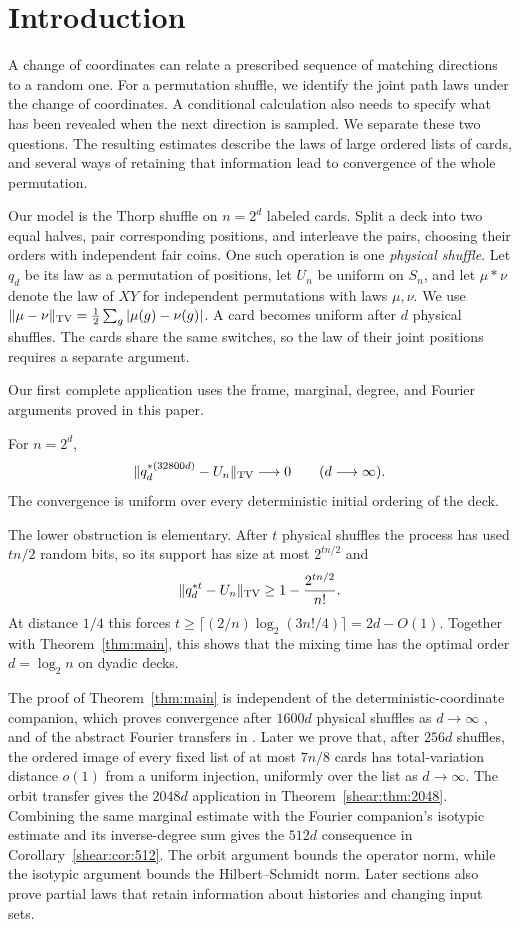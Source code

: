 \section{Introduction}
\label{sec:introduction}

A change of coordinates can relate a prescribed sequence of matching
directions to a random one. For a permutation shuffle, we identify
the joint path laws under the change of coordinates. A conditional
calculation also needs to specify what
has been revealed when the next direction is sampled. We separate these
two questions. The resulting estimates describe the laws of large
ordered lists of cards, and several ways of retaining that information
lead to convergence of the whole permutation.

Our model is the Thorp shuffle on $n=2^d$ labeled cards. Split a deck
into two equal halves, pair corresponding positions, and interleave the
pairs, choosing their orders with independent fair coins. One such
operation is one \emph{physical shuffle}. Let $q_d$ be its law as a
permutation of positions, let $U_n$ be uniform on $S_n$, and let
$\mu*\nu$ denote the law of $XY$ for independent permutations with laws
$\mu,\nu$. We use
$\|\mu-\nu\|_{\mathrm{TV}}=\frac12\sum_g|\mu(g)-\nu(g)|$.
A card becomes uniform after $d$ physical shuffles. The cards share the
same switches, so the law of their joint positions requires a separate
argument.

Our first complete application uses the frame, marginal, degree, and
Fourier arguments proved in this paper.

\begin{theorem}\label{thm:main}
For $n=2^d$,
\[
 \|q_d^{*(32800d)}-U_n\|_{\mathrm{TV}}\longrightarrow0
 \qquad(d\longrightarrow\infty).
\]
The convergence is uniform over every deterministic initial ordering
of the deck.
\end{theorem}

The lower obstruction is elementary. After $t$ physical shuffles the
process has used $tn/2$ random bits, so its support has size at most
$2^{tn/2}$ and
\[
 \|q_d^{*t}-U_n\|_{\mathrm{TV}}\ge1-\frac{2^{tn/2}}{n!}.
\]
At distance $1/4$ this forces
$t\ge\lceil(2/n)\log_2(3n!/4)\rceil=2d-O(1)$.
Together with Theorem~\ref{thm:main}, this shows that the mixing time
has the optimal order $d=\log_2 n$ on dyadic decks.

The proof of Theorem~\ref{thm:main} is independent of the
deterministic-coordinate companion, which proves convergence after
$1600d$ physical shuffles as $d\to\infty$
\cite[Theorem~1.1]{optimal-thorp}, and of the abstract Fourier
transfers in \cite{partial-fourier}. Later we prove that, after $256d$
shuffles, the ordered image of every fixed list of at most $7n/8$ cards
has total-variation distance $o(1)$ from a uniform injection, uniformly
over the list as $d\to\infty$. The orbit transfer gives the $2048d$ application in
Theorem~\ref{shear:thm:2048}. Combining the same marginal estimate with
the Fourier companion's isotypic estimate and its inverse-degree sum gives
the $512d$ consequence in Corollary~\ref{shear:cor:512}. The orbit
argument bounds the operator norm, while the isotypic argument bounds
the Hilbert--Schmidt norm. Later sections also prove partial laws that
retain information about histories and changing input sets.

